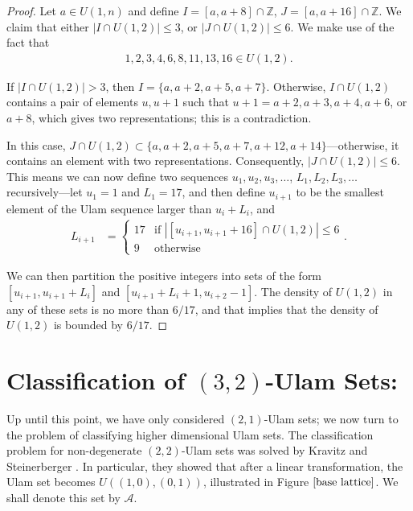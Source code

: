 \documentclass{amsart}
\newcommand{\ZZ}{\mathbb{Z}}
\newcommand{\A}{\mathcal{A}}
\theoremstyle{theorem}
\theoremstyle{definition}
\begin{document}
\begin{proof}
Let $a \in U(1,n)$ and define $I = [a, a + 8] \cap \ZZ$, $J = [a, a + 16] \cap \ZZ$. We claim that either $|I \cap U(1,2)| \leq 3$, or $|J \cap U(1,2)| \leq 6$. We make use of the fact that
	\begin{align*}
    1,2,3,4,6,8,11,13,16 \in U(1,2).
    \end{align*}
    
\noindent If $|I \cap U(1,2)| > 3$, then $I = \{a, a + 2, a + 5, a + 7\}$. Otherwise, $I \cap U(1,2)$ contains a pair of elements $u, u + 1$ such that $u + 1 = a + 2, a + 3, a + 4, a + 6$, or $a + 8$, which gives two representations; this is a contradiction.

In this case, $J \cap U(1,2) \subset \{a, a + 2, a + 5, a + 7, a + 12, a + 14\}$---otherwise, it contains an element with two representations. Consequently, $|J \cap U(1,2)| \leq 6$. This means we can now define two sequences $u_1, u_2, u_3, \ldots$, $L_1, L_2, L_3, \ldots$ recursively---let $u_1 = 1$ and $L_1 = 17$, and then define $u_{i + 1}$ to be the smallest element of the Ulam sequence larger than $u_i + L_i$, and
	\begin{align*}
    L_{i + 1} &= \begin{cases} 17 & \text{if } \left|[u_{i + 1}, u_{i + 1} + 16] \cap U(1,2)\right| \leq 6 \\ 9 & \text{otherwise} \end{cases}.
    \end{align*}
    
\noindent We can then partition the positive integers into sets of the form $[u_{i + 1}, u_{i + 1} + L_i]$ and $[u_{i + 1} + L_i + 1, u_{i + 2} - 1]$. The density of $U(1,2)$ in any of these sets is no more than $6/17$, and that implies that the density of $U(1,2)$ is bounded by $6/17$.
\end{proof}

\section{Classification of $(3,2)$-Ulam Sets:}\label{HigherDimensions}

Up until this point, we have only considered $(2,1)$-Ulam sets; we now turn to the problem of classifying higher dimensional Ulam sets. The classification problem for non-degenerate $(2,2)$-Ulam sets was solved by Kravitz and Steinerberger \cite{kravitz_steinerberger_2017}. In particular, they showed that after a linear transformation, the Ulam set becomes $U\left((1,0),(0,1)\right)$, illustrated in Figure $\ref{base lattice}$. We shall denote this set by $\A$.
\end{document}
